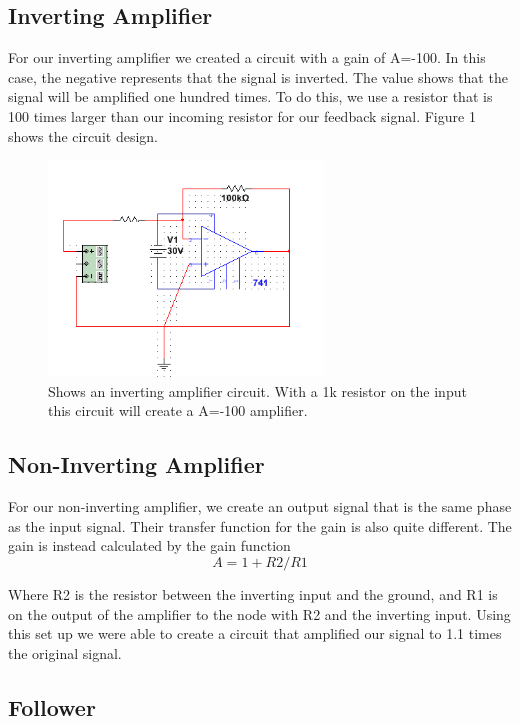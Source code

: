 \documentclass[a4paper]{article}
\begin{document}
\subsection{Inverting Amplifier}

For our inverting amplifier we created a circuit with a gain of A=-100.  In this case, the negative represents that the signal is inverted.  The value shows that the signal will be amplified one hundred times.  To do this, we use a resistor that is 100 times larger than our incoming resistor for our feedback signal.  Figure 1 shows the circuit design.

\begin{figure}
\centering
\includegraphics[width=0.65\textwidth]{Inverting100.png}
\caption{\label{fig:Inverting}Shows an inverting amplifier circuit.  With a 1k resistor on the input this circuit will create a A=-100 amplifier.}
\end{figure}

\subsection{Non-Inverting Amplifier}

For our non-inverting amplifier, we create an output signal that is the same phase as the input signal.  Their transfer function for the gain is also quite different.  The gain is instead calculated by the gain function \[A=1+R2/R1\]

Where R2 is the resistor between the inverting input and the ground, and R1 is on the output of the amplifier to the node with R2 and the inverting input.  Using this set up we were able to create a circuit that amplified our signal to 1.1 times the original signal.  

\subsection{Follower}
\end{document}

